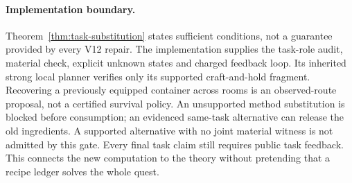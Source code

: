 \documentclass[11pt]{article}
\theoremstyle{definition}
\begin{document}
\paragraph{Implementation boundary.}
Theorem~\ref{thm:task-substitution} states sufficient conditions, not a guarantee
provided by every V12 repair. The implementation supplies the task-role audit,
material check, explicit unknown states and charged feedback loop. Its inherited
strong local planner verifies only its supported craft-and-hold fragment.
Recovering a previously equipped container across rooms is an observed-route
proposal, not a certified survival policy. An unsupported method substitution
is blocked before consumption; an evidenced same-task alternative can release
the old ingredients. A supported alternative with no joint material witness is
not admitted by this gate. Every final task claim still requires public task
feedback. This connects the new computation to the theory without pretending
that a recipe ledger solves the whole quest.
\end{document}
